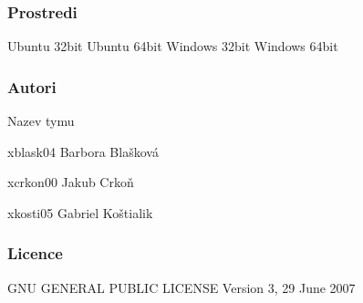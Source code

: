 \subsubsection*{Prostredi }

Ubuntu 32bit Ubuntu 64bit Windows 32bit Windows 64bit

\subsubsection*{Autori }

Nazev tymu
\begin{DoxyItemize}
\item xblask04 Barbora Blašková
\item xcrkon00 Jakub Crkoň
\item xkosti05 Gabriel Koštialik
\end{DoxyItemize}

\subsubsection*{Licence }

G\+NU G\+E\+N\+E\+R\+AL P\+U\+B\+L\+IC L\+I\+C\+E\+N\+SE Version 3, 29 June 2007 
